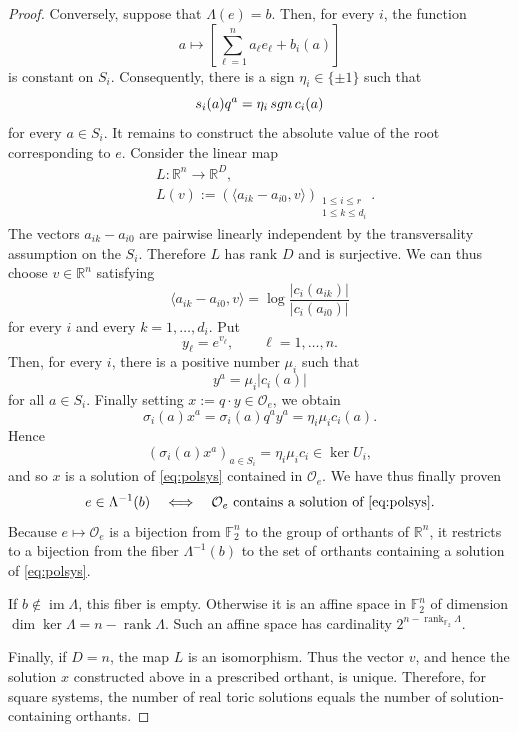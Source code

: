 \documentclass[10pt,a4paper]{amsart}
\def\FF{\mathbb{F}}
\def\RR{\mathbb{R}}
\newcommand{\sgn}{\mathop{\rm sgn}\nolimits}
\begin{document}
\begin{proof}
  Conversely, suppose that $\Lambda(e)=b$. Then, for every $i$, the function
  $$
  a\longmapsto \left[\sum_{\ell=1}^n a_\ell e_\ell+b_i(a)\right]
  $$
  is constant on $S_i$. Consequently, there is a sign
  $\eta_i\in\{\pm1\}$ such that
  $$
  s_i(a)q^a
  =
  \eta_i\sgn c_i(a)
  $$
  for every $a\in S_i$. It remains to construct the absolute value of
  the root corresponding to $e$. Consider the linear map
  \begin{align*}
    &L:\RR^n\longrightarrow\RR^D,\\
    &L(v) := \left(
    \langle a_{ik}-a_{i0},v\rangle\right)_{\substack{1\leq i\leq r\\1\leq k\leq d_i}}.  
  \end{align*}
  The vectors $a_{ik}-a_{i0}$ are pairwise linearly independent by the
  transversality assumption on the $S_i$. Therefore $L$ has rank $D$ and
  is surjective. We can thus choose $v\in\RR^n$ satisfying
  $$
  \langle a_{ik}-a_{i0},v\rangle
  =
  \log\frac{|c_i(a_{ik})|}{|c_i(a_{i0})|}
  $$
  for every $i$ and every $k=1,\ldots,d_i$. Put
  $$
  y_\ell=e^{v_\ell},
  \qquad
  \ell=1,\ldots,n.
  $$
  Then, for every $i$, there is a positive number $\mu_i$ such that
  $$
  y^a=\mu_i|c_i(a)|
  $$
  for all $a\in S_i$. Finally setting $x:=q\cdot y\in\mathcal O_e$, we obtain
  $$
  \sigma_i(a)x^a
  =
  \sigma_i(a)q^ay^a
  =
  \eta_i\mu_i c_i(a).
  $$
  Hence
  $$
  \left(\sigma_i(a)x^a\right)_{a\in S_i}
  =
  \eta_i\mu_i c_i\in\ker U_i,
  $$
  and so $x$ is a solution of \eqref{eq:polsys} contained in $\mathcal O_e$. We have
  thus finally proven
  $$
  e\in\Lambda^{-1}(b)
  \quad\Longleftrightarrow\quad
  \mathcal O_e\text{ contains a solution of \eqref{eq:polsys}}.
  $$
  Because $e\mapsto\mathcal O_e$ is a bijection from $\FF_2^n$ to the group
  of orthants of $\RR^n$, it restricts to a bijection from the fiber
  $\Lambda^{-1}(b)$ to the set of orthants containing a solution of
  \eqref{eq:polsys}.

  If $b\notin\operatorname{im}\Lambda$, this fiber is empty. Otherwise it is an
  affine space in $\FF_2^n$ of dimension
  $\dim\ker \Lambda = n-\operatorname{rank} \Lambda$. Such an affine
  space has cardinality $2^{n-\operatorname{rank}_{\mathbb F_2}\Lambda}$. 

  Finally, if $D=n$, the map $L$ is an isomorphism. Thus the vector
  $v$, and hence the solution $x$ constructed above in a prescribed orthant, is
  unique. Therefore, for square systems, the number of real toric solutions equals
  the number of solution-containing orthants.
\end{proof}
\end{document}
